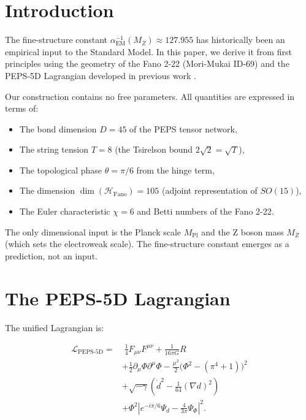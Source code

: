 \documentclass[12pt]{article}
\begin{document}
\tableofcontents

\newpage

\section{Introduction}

The fine-structure constant \(\alpha_{\text{EM}}^{-1}(M_Z) \approx 127.955\) has historically been an empirical input to the Standard Model. In this paper, we derive it from first principles using the geometry of the Fano 2-22 (Mori-Mukai ID-69) and the PEPS-5D Lagrangian developed in previous work \cite{alpha_series, fano_series}.

Our construction contains no free parameters. All quantities are expressed in terms of:
\begin{itemize}
  \item The bond dimension \(D = 45\) of the PEPS tensor network,
  \item The string tension \(T = 8\) (the Tsirelson bound \(2\sqrt{2} = \sqrt{T}\)),
  \item The topological phase \(\theta = \pi/6\) from the hinge term,
  \item The dimension \(\dim(\mathcal{H}_{\text{Fano}}) = 105\) (adjoint representation of \(SO(15)\)),
  \item The Euler characteristic \(\chi = 6\) and Betti numbers of the Fano 2-22.
\end{itemize}

The only dimensional input is the Planck scale \(M_{\text{Pl}}\) and the Z boson mass \(M_Z\) (which sets the electroweak scale). The fine-structure constant emerges as a prediction, not an input.

\section{The PEPS-5D Lagrangian}

The unified Lagrangian is:

\begin{equation}
\boxed{
\begin{aligned}
\mathcal{L}_{\text{PEPS-5D}} = &\;\frac{1}{4} F_{\mu\nu}F^{\mu\nu}
+ \frac{1}{16\pi G} R \\
&+ \frac{1}{2}\partial_\mu\Phi\partial^\mu\Phi - \frac{\mu^2}{2}\bigl(\Phi^2 - (\pi^4+1)\bigr)^2 \\
&+ \sqrt{-\gamma}\left(\dot{d}^2 - \frac{1}{64}(\nabla d)^2\right) \\
&+ \Phi^2 \left| e^{-i\pi/6} \Psi_d - \frac{4}{3\pi} \Psi_\Phi \right|^2 .
\end{aligned}
}
\label{eq:lagrangian}
\end{equation}
\end{document}
